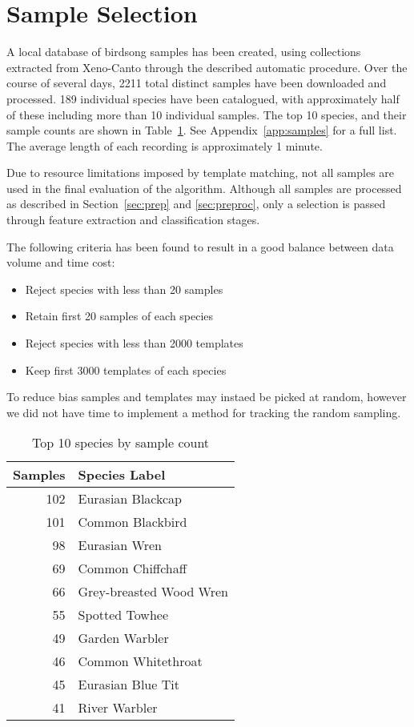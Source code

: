 \section{Sample Selection}\label{sec:sample_select}
A local database of birdsong samples has been created, using collections
extracted from Xeno-Canto through the described automatic procedure.
Over the course of several days, 2211 total distinct samples have been downloaded
and processed.
189 individual species have been catalogued, with approximately half of these
including more than 10 individual samples.
The top 10 species, and their sample counts are shown in Table~\ref{tab:top10}.
See Appendix~\ref{app:samples} for a full list.
The average length of each recording is approximately 1 minute.

Due to resource limitations imposed by template matching, not all samples
are used in the final evaluation of the algorithm.
Although all samples are processed as described in Section~\ref{sec:prep} and
\ref{sec:preproc}, only a selection is passed through feature extraction and
classification stages.

The following criteria has been found to result in a good balance between
data volume and time cost:
\begin{itemize}
  \item Reject species with less than 20 samples
  \item Retain first 20 samples of each species
  \item Reject species with less than 2000 templates
  \item Keep first 3000 templates of each species
\end{itemize}

To reduce bias samples and templates may instaed be picked at random, however
we did not have time to implement a method for tracking the random sampling.

\begin{table}[!htb]
  \caption{Top 10 species by sample count}\label{tab:top10}
  \centering
    \begin{tabular}{r l}
      Samples & Species Label \\ \hline
      102 & Eurasian Blackcap\\
      101 & Common Blackbird\\
      98  & Eurasian Wren\\
      69  & Common Chiffchaff\\
      66  & Grey-breasted Wood Wren\\
      55  & Spotted Towhee\\
      49  & Garden Warbler\\
      46  & Common Whitethroat\\
      45  & Eurasian Blue Tit\\
      41  & River Warbler\\
    \end{tabular}
\end{table}

